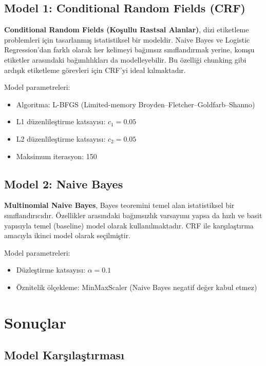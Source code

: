 \documentclass[12pt,a4paper]{article}
\begin{document}
\subsection{Model 1: Conditional Random Fields (CRF)}

\textbf{Conditional Random Fields (Koşullu Rastsal Alanlar)}, dizi etiketleme
problemleri için tasarlanmış istatistiksel bir modeldir. Naive Bayes ve Logistic
Regression'dan farklı olarak her kelimeyi bağımsız sınıflandırmak yerine,
komşu etiketler arasındaki bağımlılıkları da modelleyebilir. Bu özelliği
chunking gibi ardışık etiketleme görevleri için CRF'yi ideal kılmaktadır.

Model parametreleri:
\begin{itemize}
    \item Algoritma: L-BFGS (Limited-memory Broyden--Fletcher--Goldfarb--Shanno)
    \item L1 düzenlileştirme katsayısı: $c_1 = 0.05$
    \item L2 düzenlileştirme katsayısı: $c_2 = 0.05$
    \item Maksimum iterasyon: 150
\end{itemize}

\subsection{Model 2: Naive Bayes}

\textbf{Multinomial Naive Bayes}, Bayes teoremini temel alan istatistiksel bir sınıflandırıcıdır.
Özellikler arasındaki bağımsızlık varsayımı yapsa da hızlı ve basit yapısıyla
temel (baseline) model olarak kullanılmaktadır. CRF ile karşılaştırma amacıyla
ikinci model olarak seçilmiştir.

Model parametreleri:
\begin{itemize}
    \item Düzleştirme katsayısı: $\alpha = 0.1$
    \item Öznitelik ölçekleme: MinMaxScaler (Naive Bayes negatif değer kabul etmez)
\end{itemize}

\section{Sonuçlar}

\subsection{Model Karşılaştırması}
\end{document}
